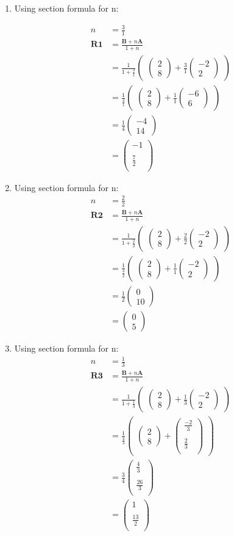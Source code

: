 \documentclass[12pt]{article}
\newcommand{\myvec}[1]{\ensuremath{\begin{pmatrix}#1\end{pmatrix}}}
\let\vec\mathbf
\begin{document}
\begin{enumerate}

\item Using section formula for n:
    
\begin{align}
n&=\frac{3}{1}\\
\vec{R1}&=\frac{\vec{B}+n\vec{A}}{1+n}\\
&=\frac{1}{1+\frac{3}{1}}  \myvec{\myvec{
2\\
8
}
  +
   \frac{3}{1}\myvec{
-2\\
2
}}\\
&= \frac{1}{\frac{4}{1}} \myvec{\myvec{
2\\
8
}
  +
\frac{1}{1}\myvec{
-6\\
6
}} \\
&=\frac{1}{4}
\myvec{
-4\\
14
}\\
&=\myvec{
-1\\
\\
\frac{7}{2}\\
}
\end{align}

\item Using section formula for n:
\begin{align}
n&=\frac{2}{2}\\
\vec{R2}&=\frac{\vec{B}+n\vec{A}}{1+n}\\
&=\frac{1}{1+\frac{2}{2}}  \myvec{\myvec{
2\\
8
}
  +
   \frac{2}{2}\myvec{
-2\\
2
}}\\
&= \frac{1}{\frac{4}{2}} \myvec{\myvec{
2\\
8
}
  +
\frac{1}{1}\myvec{
-2\\
2
}} \\
&=\frac{1}{2}
\myvec{
0\\
10
}\\
&=\myvec{
0\\
5
}
\end{align}

\item Using section formula for n:
\begin{align}
n&=\frac{1}{3}\\
\vec{R3}&=\frac{\vec{B}+n\vec{A}}{1+n}\\
&=\frac{1}{1+\frac{1}{3}}  \myvec{\myvec{
2\\
8
}
  +
   \frac{1}{3}\myvec{
-2\\
2
}}\\
&= \frac{1}{\frac{4}{3}} \myvec{\myvec{
2\\
8
}
  +
\myvec{
\frac{-2}{3}\\
\\
\frac{2}{3}\\
}} \\
&=\frac{3}{4}
\myvec{
\frac{4}{3}\\
\\
\frac{26}{3}\\
}\\
&=\myvec{
1\\
\\
\frac{13}{2}\\
}
\end{align}


\end{enumerate}
\end{document}
